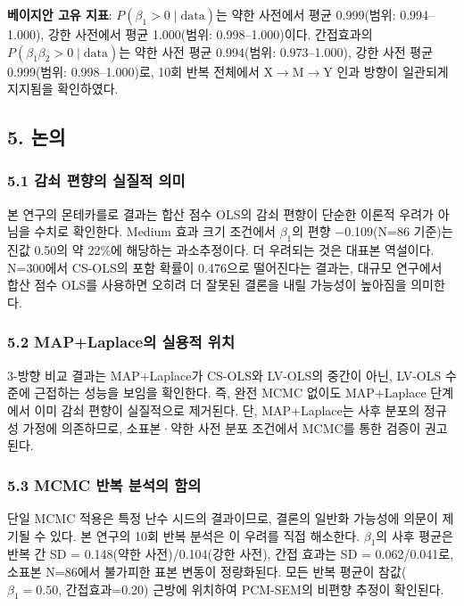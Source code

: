 \documentclass[a4paper,10pt]{oblivoir}
\begin{document}
\textbf{베이지안 고유 지표}: $P(\beta_1 > 0 \mid \text{data})$는 약한 사전에서 평균 0.999(범위: 0.994--1.000), 강한 사전에서 평균 1.000(범위: 0.998--1.000)이다. 간접효과의 $P(\beta_1\beta_2 > 0 \mid \text{data})$는 약한 사전 평균 0.994(범위: 0.973--1.000), 강한 사전 평균 0.999(범위: 0.998--1.000)로, 10회 반복 전체에서 X\ensuremath{\rightarrow}M\ensuremath{\rightarrow}Y 인과 방향이 일관되게 지지됨을 확인하였다.


\subsection{5. 논의}

\subsubsection{5.1 감쇠 편향의 실질적 의미}

본 연구의 몬테카를로 결과는 합산 점수 OLS의 감쇠 편향이 단순한 이론적 우려가 아님을 수치로 확인한다. Medium 효과 크기 조건에서 $\beta_1$의 편향 \ensuremath{-}0.109(N=86 기준)는 진값 0.50의 약 22\%에 해당하는 과소추정이다. 더 우려되는 것은 대표본 역설이다. N=300에서 CS-OLS의 포함 확률이 0.476으로 떨어진다는 결과는, 대규모 연구에서 합산 점수 OLS를 사용하면 오히려 더 잘못된 결론을 내릴 가능성이 높아짐을 의미한다.

\subsubsection{5.2 MAP+Laplace의 실용적 위치}

3-방향 비교 결과는 MAP+Laplace가 CS-OLS와 LV-OLS의 중간이 아닌, LV-OLS 수준에 근접하는 성능을 보임을 확인한다. 즉, 완전 MCMC 없이도 MAP+Laplace 단계에서 이미 감쇠 편향이 실질적으로 제거된다. 단, MAP+Laplace는 사후 분포의 정규성 가정에 의존하므로, 소표본·약한 사전 분포 조건에서 MCMC를 통한 검증이 권고된다.

\subsubsection{5.3 MCMC 반복 분석의 함의}

단일 MCMC 적용은 특정 난수 시드의 결과이므로, 결론의 일반화 가능성에 의문이 제기될 수 있다. 본 연구의 10회 반복 분석은 이 우려를 직접 해소한다. $\beta_1$의 사후 평균은 반복 간 SD = 0.148(약한 사전)/0.104(강한 사전), 간접 효과는 SD = 0.062/0.041로, 소표본 N=86에서 불가피한 표본 변동이 정량화된다. 모든 반복 평균이 참값($\beta_1=0.50$, 간접효과=0.20) 근방에 위치하여 PCM-SEM의 비편향 추정이 확인된다.
\end{document}
